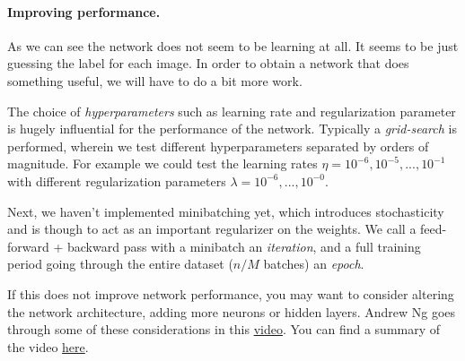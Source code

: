 \paragraph{Improving performance.}
As we can see the network does not seem to be learning at all. It seems to be just guessing the label for each image.  
In order to obtain a network that does something useful, we will have to do a bit more work.  

The choice of \emph{hyperparameters} such as learning rate and regularization parameter is hugely influential for the performance of the network. Typically a \emph{grid-search} is performed, wherein we test different hyperparameters separated by orders of magnitude. For example we could test the learning rates $\eta = 10^{-6}, 10^{-5},...,10^{-1}$ with different regularization parameters $\lambda = 10^{-6},...,10^{-0}$.  

Next, we haven't implemented minibatching yet, which introduces stochasticity and is though to act as an important regularizer on the weights. We call a feed-forward + backward pass with a minibatch an \emph{iteration}, and a full training period
going through the entire dataset ($n/M$ batches) an \emph{epoch}.

If this does not improve network performance, you may want to consider altering the network architecture, adding more neurons or hidden layers.  
Andrew Ng goes through some of these considerations in this \href{{https://youtu.be/F1ka6a13S9I}}{video}. You can find a summary of the video \href{{https://kevinzakka.github.io/2016/09/26/applying-deep-learning/}}{here}.  


